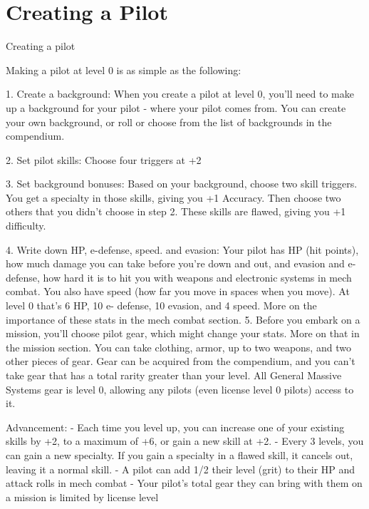 \section{Creating a Pilot}
                                              Creating a pilot

Making a pilot at level 0 is as simple as the following:


     1.  Create a background: When you create a pilot at level 0, you’ll need to make up a
         background for your pilot - where your pilot comes from. You can create your own
         background, or roll or choose from the list of backgrounds in the compendium.

    2.   Set pilot skills: Choose four triggers at +2

    3.   Set background bonuses: Based on your background, choose two skill triggers. You get
         a specialty in those skills, giving you +1 Accuracy. Then choose two others that you didn’t
         choose in step 2. These skills are flawed, giving you +1 difficulty.

    4.   Write down HP, e-defense, speed. and evasion: Your pilot has HP (hit points), how much
         damage you can take before you’re down and out, and evasion and e-defense, how
         hard it is to hit you with weapons and electronic systems in mech combat. You also have
         speed (how far you move in spaces when you move). At level 0 that’s 6 HP, 10 e-
         defense, 10 evasion, and 4 speed. More on the importance of these stats in the mech
         combat section.
    5.   Before you embark on a mission, you’ll choose pilot gear, which might change your
         stats. More on that in the mission section. You can take clothing, armor, up to two
         weapons, and two other pieces of gear. Gear can be acquired from the compendium, and
         you can’t take gear that has a total rarity greater than your level. All General Massive
         Systems gear is level 0, allowing any pilots (even license level 0 pilots) access to it.


Advancement:
          - Each time you level up, you can increase one of your existing skills by +2, to a maximum
         of +6, or gain a new skill at +2.
          - Every 3 levels, you can gain a new specialty. If you gain a specialty in a flawed skill, it
         cancels out, leaving it a normal skill.
         - A pilot can add 1/2 their level (grit) to their HP and attack rolls in mech combat
         - Your pilot’s total gear they can bring with them on a mission is limited by license level


